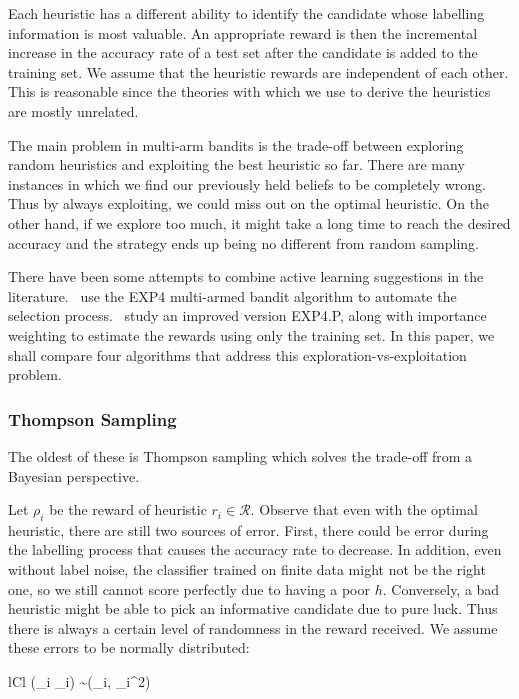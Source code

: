 \documentclass[fleqn,10pt,lineno]{wlpeerj} %
\newcommand{\Normal}{\mathcal{N}}
\newcommand{\R}{\mathcal{R}}
\begin{document}
Each heuristic has a different ability to identify the candidate whose
labelling information is most valuable. An appropriate reward is then the
incremental increase in the accuracy rate of a test set after the candidate is
added to the training set. We assume that the heuristic rewards are independent
of each other. This is reasonable since the theories with which we use to
derive the heuristics are mostly unrelated.

The main problem in multi-arm bandits is the trade-off between exploring random
heuristics and exploiting the best heuristic so far. There are many instances
in which we find our previously held beliefs to be completely wrong. Thus by
always exploiting, we could miss out on the optimal heuristic. On the other
hand, if we explore too much, it might take a long time to reach the desired
accuracy and the strategy ends up being no different from random sampling.

There have been some attempts to combine active learning suggestions in the
literature.~\cite{baram04} use the EXP4 multi-armed bandit algorithm to
automate the selection process.~\cite{hsu15} study an improved version
EXP4.P, along with importance weighting to estimate the rewards using only the
training set. In this paper, we shall compare four algorithms that address this
exploration-vs-exploitation problem.

\subsubsection*{Thompson Sampling}

The oldest of these is Thompson sampling \citep{thompson33} which solves the
trade-off from a Bayesian perspective.

Let $\rho_i$ be the reward of heuristic $r_i \in \R$. Observe
that even with the optimal heuristic, there are still two sources of error.
First, there could be error during the labelling process that causes the
accuracy rate to decrease. In addition, even without label noise, the
classifier trained on finite data might not be the right one, so we still
cannot score perfectly due to having a poor $h$. Conversely, a bad heuristic
might be able to pick an informative candidate due to pure luck. Thus there is
always a certain level of randomness in the reward received. We assume these
errors to be normally distributed:
	\begin{IEEEeqnarray*}{lCl}
		(\rho_i \mid \nu_i) \sim \Normal(\nu_i, \tau_i^2)
	\end{IEEEeqnarray*}
\end{document}
